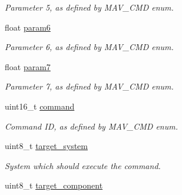 \begin{DoxyCompactItemize}
\begin{DoxyCompactList}\small\item\em Parameter 5, as defined by M\+A\+V\+\_\+\+C\+M\+D enum. \end{DoxyCompactList}\item 
\hypertarget{struct____mavlink__command__long__t_ad75daa212f56fd47cd0956f8dc4fdbd5}{float \hyperlink{struct____mavlink__command__long__t_ad75daa212f56fd47cd0956f8dc4fdbd5}{param6}}\label{struct____mavlink__command__long__t_ad75daa212f56fd47cd0956f8dc4fdbd5}

\begin{DoxyCompactList}\small\item\em Parameter 6, as defined by M\+A\+V\+\_\+\+C\+M\+D enum. \end{DoxyCompactList}\item 
\hypertarget{struct____mavlink__command__long__t_a1bf675e543b14770e7c410adb9d3d21e}{float \hyperlink{struct____mavlink__command__long__t_a1bf675e543b14770e7c410adb9d3d21e}{param7}}\label{struct____mavlink__command__long__t_a1bf675e543b14770e7c410adb9d3d21e}

\begin{DoxyCompactList}\small\item\em Parameter 7, as defined by M\+A\+V\+\_\+\+C\+M\+D enum. \end{DoxyCompactList}\item 
\hypertarget{struct____mavlink__command__long__t_a059e44ecfa8fbb9f11543a81145265cf}{uint16\+\_\+t \hyperlink{struct____mavlink__command__long__t_a059e44ecfa8fbb9f11543a81145265cf}{command}}\label{struct____mavlink__command__long__t_a059e44ecfa8fbb9f11543a81145265cf}

\begin{DoxyCompactList}\small\item\em Command I\+D, as defined by M\+A\+V\+\_\+\+C\+M\+D enum. \end{DoxyCompactList}\item 
\hypertarget{struct____mavlink__command__long__t_a705313e3359248c2e2b77d71b99a5d3d}{uint8\+\_\+t \hyperlink{struct____mavlink__command__long__t_a705313e3359248c2e2b77d71b99a5d3d}{target\+\_\+system}}\label{struct____mavlink__command__long__t_a705313e3359248c2e2b77d71b99a5d3d}

\begin{DoxyCompactList}\small\item\em System which should execute the command. \end{DoxyCompactList}\item 
\hypertarget{struct____mavlink__command__long__t_ab2e28f55169c5076999e2c941bafce39}{uint8\+\_\+t \hyperlink{struct____mavlink__command__long__t_ab2e28f55169c5076999e2c941bafce39}{target\+\_\+component}}\label{struct____mavlink__command__long__t_ab2e28f55169c5076999e2c941bafce39}


\end{DoxyCompactItemize}
